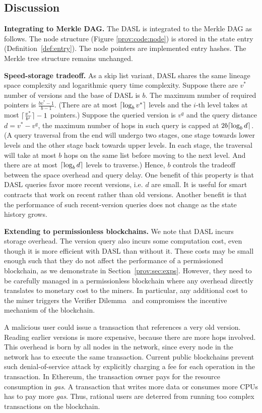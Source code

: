 \subsection{Discussion} \label{prov:sec:model_discuss}
\textbf{Integrating to Merkle DAG. } 
The DASL is integrated to the Merkle DAG as follows. The node structure (Figure \ref{prov:code:node}) is stored in
the state entry (Definition~\ref{def:entry}).  The node pointers are implemented entry hashes. The Merkle tree
structure remains unchanged.  

\textbf{Speed-storage tradeoff. } 
As a skip list variant, DASL shares the same lineage space complexity and 
logarithmic query time complexity. 
Suppose there are $v^*$ number of versions and the base of DASL is $b$. 
The maximum number of required pointers is $\frac{bv^*-1}{b-1}$. 
(There are at most $\lceil\log_b v^*\rceil$ levels and the $i$-th level takes at most $\lceil\frac{v^*}{b^i}\rceil-1$ pointers.)
Suppose the queried version is $v^q$ and the query distance $d=v^*-v^q$, the maximum number of hops in such query is capped at $2b\lceil\log_b d\rceil$. (A query traversal from the end will undergo two stages, one stage towards lower levels  and the other stage back towards upper levels. In each stage, 
the traversal will take at most $b$ hops on the same list before moving to the next level.
And there are at most $\lceil\log_b d\rceil$ levels to traverse.)
Hence, $b$ controls the tradeoff between the space overhead and query delay. 
One benefit of this property is that DASL queries favor more recent
versions, i.e. $d$ are small.
It is useful for smart contracts that work on recent rather than old versions.  
Another benefit is that the performance of such recent-version queries does not change as the state history grows.  

\textbf{Extending to permissionless blockchains. } 
We note that DASL incurs storage overhead. The version query also incurs some computation cost, even though it
is more efficient with DASL than without it. These costs may be small enough such that they do not
affect the performance of a permissioned blockchain, as we demonstrate in Section~\ref{prov:sec:exps}.  However,
they need to be carefully managed in a permissionless blockchain where any overhead directly translates to
monetary cost to the miners. In particular, any additional cost to the miner triggers the Verifier
Dilemma~\cite{luu2015demystifying} and compromises the incentive mechanism of the blockchain.  

A malicious user could issue a transaction that references a very old version. Reading earlier versions is more
expensive, because there are more hops involved. This overhead is born by all nodes in the network,
since every node in the network has to execute the same transaction. Current public blockchains prevent such
denial-of-service attack by explicitly charging a fee for each operation in the transaction. In Ethereum, the
transaction owner pays for the resource consumption in {\em gas}. A transaction that writes more data or
consumes more CPUs has to pay more {\em gas}. Thus, rational users are deterred from running too complex
transactions on the blockchain. 

